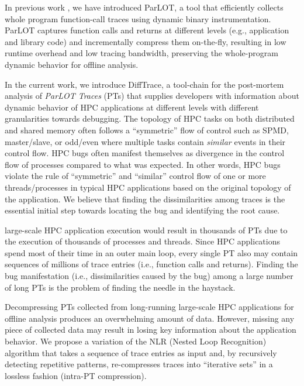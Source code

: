 In previous work \cite{parlot}, we have introduced ParLOT, a tool that efficiently collects whole program function-call traces using dynamic binary instrumentation.
%
ParLOT captures function calls and returns at different levels (e.g., application and library code) and incrementally compress them on-the-fly, resulting in low runtime overhead and low tracing bandwidth, preserving the whole-program dynamic behavior for offline analysis.
%

In the current work, we introduce DiffTrace, a tool-chain for the post-mortem analysis of \textit{ParLOT Traces} (PTs) that supplies developers with information about dynamic behavior of HPC applications at different levels with different granularities towards debugging.
%
The topology of HPC tasks on both distributed and shared memory often follows a ``symmetric'' flow of control such as SPMD, master/slave, or odd/even where multiple tasks contain \textit{similar} events in their control flow.
%
HPC bugs often manifest themselves as divergence in the control flow of processes compared to what was expected.
%
In other words, HPC bugs violate the rule of ``symmetric'' and ``similar'' control flow of one or more threads/processes in typical HPC applications based on the original topology of the application.
%
We believe that finding the dissimilarities among traces is the essential initial step towards locating the bug and identifying the root cause.

large-scale HPC application execution would result in thousands of PTs due to the execution of thousands of processes and threads.
%
Since HPC applications spend most of their time in an outer main loop, every single PT also may contain sequences of millions of trace entries (i.e., function calls and returns).
%
Finding the bug manifestation (i.e., dissimilarities caused by the bug) among a large number of long PTs is the problem of finding the needle in the haystack.

%
Decompressing PTs collected from long-running large-scale HPC applications for offline analysis produces an overwhelming amount of data. However, missing any piece of collected data may result in losing key information about the application behavior.
%
We propose a variation of the NLR (Nested Loop Recognition) algorithm \cite{Ketterlin-nlr} that takes a sequence of trace entries as input and, by recursively detecting repetitive patterns, re-compresses traces into ``iterative sets'' in a lossless fashion (intra-PT compression).
%

